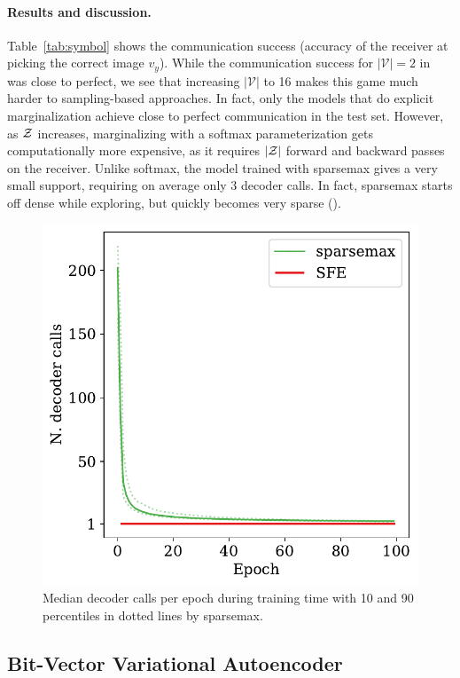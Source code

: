 \paragraph*{Results and discussion.}

Table~\ref{tab:symbol} shows the communication success (accuracy of
the receiver at picking the correct image $v_y$). While the
communication success for $|\mathcal{V}|=2$ in \citet{Lazaridou2017}
was close to perfect, we see that increasing $|\mathcal{V}|$ to 16
makes this game much harder to sampling-based approaches. In fact,
only the models that do explicit marginalization achieve close to
perfect communication in the test set. However, as $\mathcal{Z}$ increases,
marginalizing with a softmax parameterization gets computationally
more expensive, as it requires $|\mathcal{Z}|$ forward and backward passes on
the receiver. Unlike softmax, the model trained with sparsemax
gives a very small support, requiring on average only 3 decoder
calls. In fact, sparsemax
starts off dense while exploring, but quickly becomes very sparse
().

\begin{figure}[ht]
    \centering
    \includegraphics[width=0.65\columnwidth]{Figures/sparsemax_nonzero_em_comm.pdf}
    \caption{
        Median decoder calls per epoch during training
        time with 10 and 90 percentiles in dotted lines by sparsemax.
    }
    \label{fig:nonzero_comm}
\end{figure}

\subsection{Bit-Vector Variational Autoencoder}\label{sec:bernvae}

